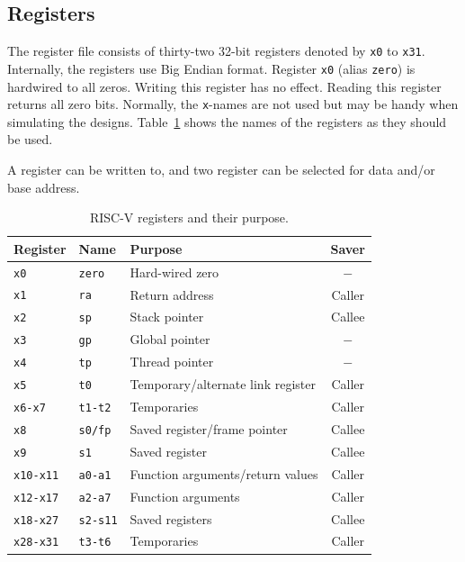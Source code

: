 \documentclass[12pt]{article}
\begin{document}
\subsection{Registers}
The register file consists of thirty-two 32-bit registers denoted by \texttt{x0} to \texttt{x31}. Internally, the registers use Big Endian format. Register \texttt{x0} (alias \texttt{zero}) is hardwired to all zeros. Writing this register has no effect. Reading this register returns all zero bits. Normally, the \texttt{x}-names are not used but may be handy when simulating the designs. Table~\ref{tab:registers} shows the names of the registers as they should be used.

A register can be written to, and two register can be selected for data and/or base address.

\begin{table}[!ht]
\centering
\caption{RISC-V registers and their purpose.}
\label{tab:registers}
\begin{tabular}{lllc}
Register & Name & Purpose & Saver \\
\midrule
\texttt{x0}      & \texttt{zero}   & Hard-wired zero                   & $-$ \\
\texttt{x1}      & \texttt{ra}     & Return address                    & Caller \\
\texttt{x2}      & \texttt{sp}     & Stack pointer                     & Callee \\
\texttt{x3}      & \texttt{gp}     & Global pointer                    & $-$ \\
\texttt{x4}      & \texttt{tp}     & Thread pointer                    & $-$ \\
\texttt{x5}      & \texttt{t0}     & Temporary/alternate link register & Caller \\
\texttt{x6-x7}   & \texttt{t1-t2}  & Temporaries                       & Caller \\
\texttt{x8}      & \texttt{s0/fp}  & Saved register/frame pointer      & Callee \\
\texttt{x9}      & \texttt{s1}     & Saved register                    & Callee \\
\texttt{x10-x11} & \texttt{a0-a1}  & Function arguments/return values  & Caller \\
\texttt{x12-x17} & \texttt{a2-a7}  & Function arguments                & Caller \\
\texttt{x18-x27} & \texttt{s2-s11} & Saved registers                   & Callee \\
\texttt{x28-x31} & \texttt{t3-t6}  & Temporaries                       & Caller
\end{tabular}
\end{table}
\end{document}
